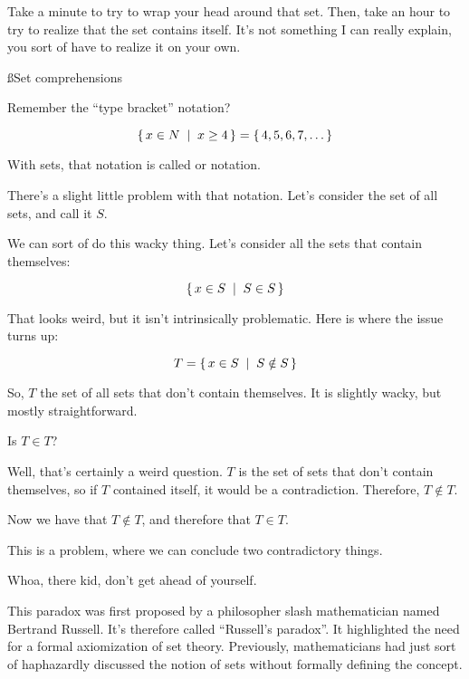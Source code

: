 Take a minute to try to wrap your head around that set. Then, take an hour to
try to realize that the set contains itself. It's not something I can really
explain, you sort of have to realize it on your own.

\ss{Set comprehensions}

Remember the ``type bracket'' notation?

\begin{equation}
    \left\{\, x \in N\; \mid \; x \ge 4 \,\right\} = \left\{\, 4,5,6,7,\dots \,\right\}
\end{equation}

With sets, that notation is called  or  notation.

There's a slight little problem with that notation. Let's consider the set of
all sets, and call it $S$.

We can sort of do this wacky thing. Let's consider all the sets that contain
themselves:

\begin{equation}
    \left\{\, x \in S\; \mid \; S \in S \,\right\}
\end{equation}

That looks weird, but it isn't intrinsically problematic. Here is where the
issue turns up:

\begin{equation}
    T = \left\{\, x \in S\; \mid \; S \notin S \,\right\}
\end{equation}

So, $T$ the set of all sets that don't contain themselves. It is slightly wacky,
but mostly straightforward.

Is $T \in T$?

Well, that's certainly a weird question. $T$ is the set of sets that don't
contain themselves, so if $T$ contained itself, it would be a
contradiction. Therefore, $T \notin T$.

Now we have that $T \notin T$, and therefore that $T \in T$.

This is a problem, where we can conclude two contradictory things.

 Whoa, there kid, don't get ahead of yourself.

This paradox was first proposed by a philosopher slash mathematician named
Bertrand Russell. It's therefore called ``Russell's paradox''. It highlighted
the need for a formal axiomization of set theory. Previously, mathematicians had
just sort of haphazardly discussed the notion of sets without formally defining
the concept.

